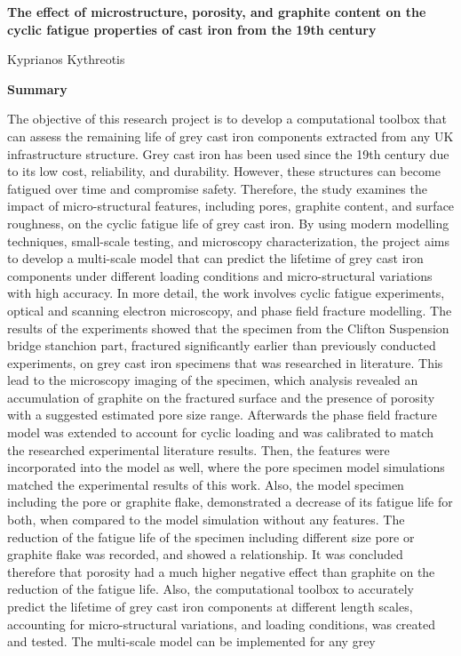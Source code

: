 \documentclass[11pt,a4paper]{article}
\begin{document}

\onecolumn

\begin{center}
\textbf{\fontsize{18}{\baselineskip}\selectfont The effect of microstructure, porosity, and graphite content on the cyclic fatigue properties of cast iron from the 19th century}
\bigskip

\fontsize{14}{\baselineskip}\selectfont Kyprianos Kythreotis

\bigskip
\bigskip
\bigskip
\bigskip
\end{center}

\noindent \textbf{\fontsize{14}{\baselineskip}\selectfont Summary}

\bigskip

\noindent The objective of this research project is to develop a computational toolbox that can assess the remaining life of grey cast iron components extracted from any UK infrastructure structure. Grey cast iron has been used since the 19th century due to its low cost, reliability, and durability. However, these structures can become fatigued over time and compromise safety. Therefore, the study examines the impact of micro-structural features, including pores, graphite content, and surface roughness, on the cyclic fatigue life of grey cast iron. By using modern modelling techniques, small-scale testing, and microscopy characterization, the project aims to develop a multi-scale model that can predict the lifetime of grey cast iron components under different loading conditions and micro-structural variations with high accuracy. In more detail, the work involves cyclic fatigue experiments, optical and scanning electron microscopy, and phase field fracture modelling. The results of the experiments showed that the specimen from the Clifton Suspension bridge stanchion part, fractured significantly earlier than previously conducted experiments, on grey cast iron specimens that was researched in literature. This lead to the microscopy imaging of the specimen, which analysis revealed an accumulation of graphite on the fractured surface and the presence of porosity with a suggested estimated pore size range. Afterwards the phase field fracture model was extended to account for cyclic loading and was calibrated to match the researched experimental literature results. Then, the features were incorporated into the model as well, where the pore specimen model simulations matched the experimental results of this work. Also, the model specimen including the pore or graphite flake, demonstrated a decrease of its fatigue life for both, when compared to the model simulation without any features. The reduction of the fatigue life of the specimen including different size pore or graphite flake was recorded, and showed a relationship. It was concluded therefore that porosity had a much higher negative effect than graphite on the reduction of the fatigue life. Also, the computational toolbox to accurately predict the lifetime of grey cast iron components at different length scales, accounting for micro-structural variations, and loading conditions, was created and tested. The multi-scale model can be implemented for any grey 
\end{document}
